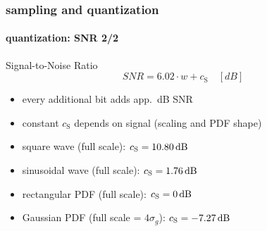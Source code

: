 	\begin{frame}\frametitle{sampling and quantization}\framesubtitle{quantization: SNR 2/2}
		\begin{block}{Signal-to-Noise Ratio}
			\centering
			\begin{equation}
				SNR = 6.02\cdot w + c_{\mathrm{S}}\quad [dB]
			\end{equation}
			\begin{itemize}
				\item	every additional bit adds app.\ \unit[6]{dB} SNR
				\item	constant $c_{\mathrm{S}}$ depends on signal (scaling and PDF shape)
			\end{itemize}
		\end{block}
		\pause
		\begin{itemize}
			\item	square wave (full scale): $c_{\mathrm{S}} =  \unit[10.80]{dB}$
			\item	sinusoidal wave (full scale): $c_{\mathrm{S}} =  \unit[1.76]{dB}$
			\item	rectangular {PDF} (full scale): $c_{\mathrm{S}} =  \unit[0]{dB}$
			\item	Gaussian {PDF} (full scale = $4\sigma_{g}$): $c_{\mathrm{S}} =  \unit[-7.27]{dB}$
		\end{itemize}
	\end{frame}		
